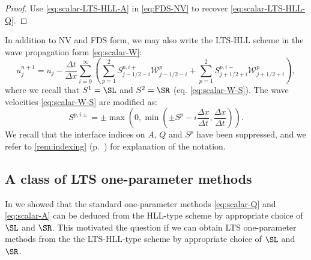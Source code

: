 \begin{proof}
Use \eqref{eq:scalar-LTS-HLL-A} in \eqref{eq:FDS-NV} to recover \eqref{eq:scalar-LTS-HLL-Q}.
\end{proof}

In addition to NV and FDS form, we may also write the LTS-HLL scheme in the wave propagation form \eqref{eq:scalar-W}:
\begin{equation} \label{eq:scalar-LTS-W}
u_j^{n+1} = u_j - \frac{\Delta t}{\Delta x} \sum\limits_{i=0}^{\infty} \left( \sum\limits_{p=1}^{2} S_{j-1/2-i}^{p,i+} \mathcal{W}_{j-1/2-i}^p + \sum\limits_{p=1}^{2} S_{j+1/2+i}^{p,i-} \mathcal{W}_{j+1/2+i}^p \right),
\end{equation}
where we recall that $ S^1 = \SL $ and $ S^2 = \SR $ (eq. \eqref{eq:scalar-W-S}). The wave velocities \eqref{eq:scalar-W-S} are modified as:
\begin{equation} \label{eq:scalar-LTS-W-S}
S^{p,i\pm} = \pm \max \left( 0, \min \left( \pm S^p - i \frac{\Delta x}{\Delta t}, \frac{\Delta x}{\Delta t} \right) \right).
\end{equation}
We recall that the interface indices on $ A $, $ Q $ and $ S^p $ have been suppressed, and we refer to \cref{rem:indexing} (p.~\pageref{eq:scalar-LTS-Roe-NV}) for explanation of the notation.

\subsection{A class of LTS one-parameter methods}
\label{cha3:sec:LTS-one-parameter}

In  we showed that the standard one-parameter methods \eqref{eq:scalar-Q} and \eqref{eq:scalar-A} can be deduced from the HLL-type scheme by appropriate choice of $ \SL $ and $ \SR $. This motivated the question if we can obtain LTS one-parameter methods from the the LTS-HLL-type scheme by appropriate choice of $ \SL $ and $ \SR $. 

